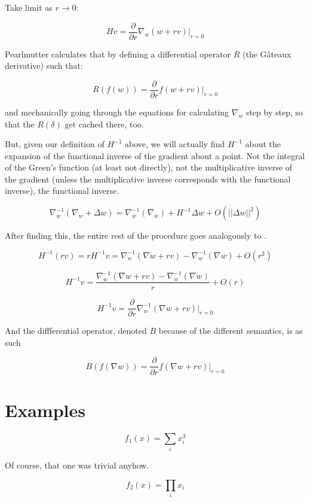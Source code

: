 \documentclass{article}
\begin{document}
Take limit as $r \rightarrow 0$:

$$Hv = \frac{\partial}{\partial r} \nabla_w (w + rv) |_{r=0}$$

Pearlmutter calculates that by defining a differential operator $R$ (the G\^{a}teaux derivative\cite{gateaux1913}) such that:

$$R(f(w)) = \frac{\partial}{\partial r} f(w + rv)|_{r=0}$$

and mechanically going through the equations for calculating $\nabla_w$ step by step, so that the $R(\delta)$ get cached there, too.

But, given our definition of $H^{-1}$ above, we will actually find $H^{-1}$ about the expansion of the functional inverse of the gradient about a point. Not the integral of the Green's function (at least not directly), not the multiplicative inverse of the gradient (unless the multiplicative inverse corresponds with the functional inverse), the functional inverse.

$$\nabla_w^{-1} (\nabla_w + \Delta w) = \nabla_w^{-1} (\nabla_w) + H^{-1} \Delta w + O(||\Delta w||^2)$$

After finding this, the entire rest of the procedure goes analogously to \cite{pearlmutter1994}.

$$H^{-1}(rv) = rH^{-1}v = \nabla_w^{-1}(\nabla w + rv) - \nabla_w^{-1}(\nabla w) + O(r^2)$$

$$H^{-1}v = \frac{\nabla_w^{-1}(\nabla w + rv) - \nabla_w^{-1}(\nabla w)}{r} + O(r)$$

$$H^{-1}v = \frac{\partial}{\partial r} \nabla_w^{-1} (\nabla w + rv) |_{r=0}$$

And the diffferential operator, denoted $B$ because of the different semantics, is as such

$$B(f(\nabla w)) = \frac{\partial}{\partial r} f(\nabla w + rv)|_{r=0}$$

\section{Examples}

$$ f_1(x) = \sum_i x_i^3 $$


Of course, that one was trivial anyhow.

$$ f_2(x) = \prod_i x_i$$

\end{document}

